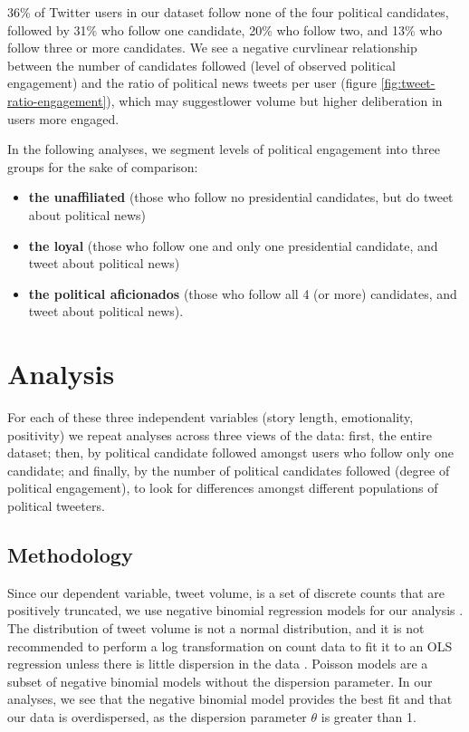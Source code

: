 \documentclass[letterpaper]{article}
\begin{document}
36\% of Twitter users in our dataset follow none of the four political candidates, followed by 31\% who follow one candidate, 20\% who follow two, and 13\% who follow three or more candidates. We see a negative curvlinear relationship between the number of candidates followed (level of observed political engagement) and the ratio of political news tweets per user (figure \ref{fig:tweet-ratio-engagement}), which may suggestlower volume but higher deliberation in users more engaged.

In the following analyses, we segment levels of political engagement into three groups for the sake of comparison:

\begin{itemize}
  \item \textbf{the unaffiliated} (those who follow no presidential candidates, but do tweet about political news)
  \item \textbf{the loyal} (those who follow one and only one presidential candidate, and tweet about political news)
  \item \textbf{the political aficionados} (those who follow all 4 (or more) candidates, and tweet about political news).
\end{itemize}


\section{Analysis} 
For each of these three independent variables (story length, emotionality, positivity) we repeat analyses across three views of the data: first, the entire dataset; then, by political candidate followed amongst users who follow only one candidate; and finally, by the number of political candidates followed (degree of political engagement), to look for differences amongst different populations of political tweeters.


\subsection{Methodology}

Since our dependent variable, tweet volume, is a set of discrete counts that are positively truncated, we use negative binomial regression models for our analysis \cite{scott1997regression}. The distribution of tweet volume is not a normal distribution, and it is not recommended to perform a log transformation on count data to fit it to an OLS regression unless there is little dispersion in the data \cite{o2010not}. Poisson models are a subset of negative binomial models without the dispersion parameter. In our analyses, we see that the negative binomial model provides the best fit and that our data is overdispersed, as the dispersion parameter $\theta$ is greater than 1.   
\end{document}
